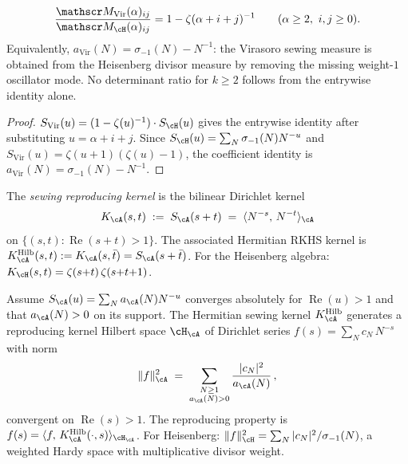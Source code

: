 \begin{corollary}%
\label{cor:virasoro-gram-ratio}%
%
\begin{equation}\label{eq:surface-minor-ratio}
\frac{\mathscr M_{\mathrm{Vir}}(\alpha)_{ij}}
{\mathscr M_{\cH}(\alpha)_{ij}}
=
1-\zeta(\alpha+i+j)^{-1}
\qquad(\alpha\geq2,\ i,j\geq0).
\end{equation}
Equivalently,
$a_{\mathrm{Vir}}(N)=\sigma_{-1}(N)-N^{-1}$: the Virasoro sewing
measure is obtained from the Heisenberg divisor measure by removing
the missing weight-$1$ oscillator mode. No determinant ratio for
$k\geq2$ follows from the entrywise identity alone.
\end{corollary}

\begin{proof}
$S_{\mathrm{Vir}}(u) = (1 - \zeta(u)^{-1})\cdot S_\cH(u)$
gives the entrywise identity after substituting
$u=\alpha+i+j$. Since
$S_\cH(u)=\sum_N\sigma_{-1}(N)N^{-u}$ and
$S_{\mathrm{Vir}}(u)=\zeta(u{+}1)(\zeta(u)-1)$, the coefficient
identity is
$a_{\mathrm{Vir}}(N)=\sigma_{-1}(N)-N^{-1}$.
\end{proof}

\begin{definition}%
\label{def:sewing-kernel}%
%
The \emph{sewing reproducing kernel} is the bilinear Dirichlet kernel
\begin{equation}\label{eq:sewing-kernel}
K_\cA(s,t) \;:=\; S_\cA(s+t)
\;=\; \langle N^{-s},\, N^{-t}\rangle_\cA
\end{equation}
on $\{(s,t) : \operatorname{Re}(s+t) > 1\}$.
The associated Hermitian RKHS kernel is
$K_\cA^{\mathrm{Hilb}}(s,t):=K_\cA(s,\bar t)=S_\cA(s+\bar t)$.
For the Heisenberg algebra:
$K_\cH(s,t) = \zeta(s{+}t)\,\zeta(s{+}t{+}1)$.
\end{definition}

\begin{theorem}%
\label{thm:sewing-rkhs}%
%
Assume $S_\cA(u)=\sum_N a_\cA(N)N^{-u}$ converges absolutely for
$\operatorname{Re}(u)>1$ and that $a_\cA(N)>0$ on its support.
The Hermitian sewing kernel $K_\cA^{\mathrm{Hilb}}$ generates a
reproducing kernel Hilbert space $\cH_\cA$ of Dirichlet
series $f(s) = \sum_N c_N\,N^{-s}$ with norm
\begin{equation}\label{eq:sewing-rkhs-norm}
\|f\|_\cA^2
\;=\;
\sum_{\substack{N\geq 1\\a_\cA(N)>0}}
\frac{|c_N|^2}{a_\cA(N)}\,,
\end{equation}
convergent on $\operatorname{Re}(s) > 1$.
The reproducing property is
$f(s) = \langle f,\,
K_\cA^{\mathrm{Hilb}}(\cdot, s)\rangle_{\cH_\cA}$.
For Heisenberg: $\|f\|_\cH^2 = \sum_N |c_N|^2/\sigma_{-1}(N)$,
a weighted Hardy space with multiplicative divisor weight.
\end{theorem}

